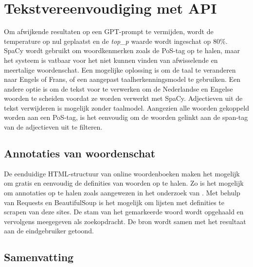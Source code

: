 \section{Tekstvereenvoudiging met API}

Om afwijkende resultaten op een GPT-prompt te vermijden, wordt de temperature op nul geplaatst en de \textit{top\_p} waarde wordt ingeschat op 80\%. SpaCy wordt gebruikt om woordkenmerken zoals de PoS-tag op te halen, maar het systeem is vatbaar voor het niet kunnen vinden van afwisselende en meertalige woordenschat. Een mogelijke oplossing is om de taal te veranderen naar Engels of Frans, of een aangepast taalherkenningsmodel te gebruiken. Een andere optie is om de tekst voor te verwerken om de Nederlandse en Engelse woorden te scheiden voordat ze worden verwerkt met SpaCy. Adjectieven uit de tekst verwijderen is mogelijk zonder taalmodel. Aangezien alle woorden gekoppeld worden aan een PoS-tag, is het eenvoudig om de woorden gelinkt aan de span-tag van de adjectieven uit te filteren.

\subsection{Annotaties van woordenschat}

De eenduidige HTML-structuur van online woordenboeken maken het mogelijk om gratis en eenvoudig de definities van woorden op te halen. Zo is het mogelijk om annotaties op te halen zoals aangewezen in het onderzoek van \textcite{Bulte2018}. Met behulp van Requests en BeautifulSoup is het mogelijk om lijsten met definities te scrapen van deze sites. De stam van het gemarkeerde woord wordt opgehaald en vervolgens meegegeven als zoekopdracht. De bron wordt samen met het resultaat aan de eindgebruiker getoond. 

\subsection{Samenvatting}

